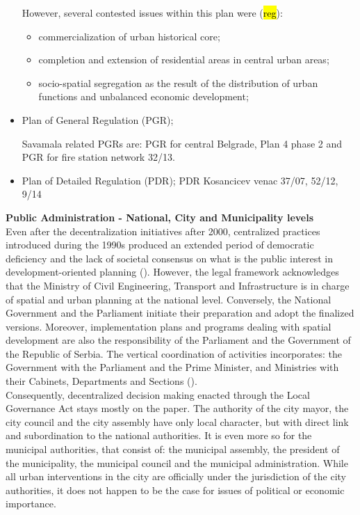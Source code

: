\documentclass[11pt]{report}
\begin{document}
\begin{itemize}
However, several contested issues within this plan were (\hl{reg}):
\begin{itemize}
\item commercialization  of  urban  historical core;
\item completion and extension of residential  areas in central urban areas;
\item socio-spatial segregation as the result of the distribution of urban functions and unbalanced economic development;
\end{itemize}

\item Plan of General Regulation (PGR);

Savamala related PGRs are: PGR for central Belgrade, Plan 4 phase 2 and PGR for fire station network 32/13.
\item Plan of Detailed Regulation (PDR);
PDR Kosancicev venac 37/07, 52/12, 9/14
\end{itemize}

\textbf{Public Administration - National, City and Municipality levels}
\\
Even after the decentralization initiatives after 2000, centralized practices introduced during the 1990s produced an extended period of democratic deficiency and the lack of societal consensus on what is the public interest in development-oriented planning (\cite{Vujosevic 2012}).
However, the legal framework acknowledges that the Ministry of Civil Engineering, Transport and Infrastructure is in charge of spatial and urban planning at the national level.
Conversely, the National Government and the Parliament initiate their preparation and adopt the finalized versions.
Moreover, implementation plans and programs dealing with spatial development are also the responsibility of the Parliament and the Government of the Republic of Serbia.
The vertical coordination of activities incorporates: the Government with the Parliament and the Prime Minister, and Ministries with their Cabinets, Departments and Sections (\cite{Stojkov and Dobricic 2012 02}).
\\
Consequently, decentralized decision making enacted through the Local Governance Act stays mostly on the paper.
The authority of the city mayor, the city council and the city assembly have only local character, but with direct link and subordination to the national authorities.
It is even more so for the municipal authorities, that consist of: the municipal assembly, the president of the municipality, the municipal council and the municipal administration.  While all urban interventions in the city are officially under the jurisdiction of the city authorities, it does not happen to be the case for issues of political or economic importance.
\end{document}
